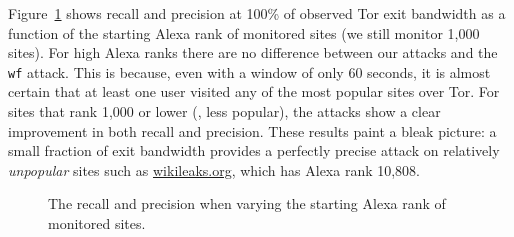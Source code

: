 Figure~\ref{fig:fpt:alexa} shows recall and precision at 100\% of
observed Tor exit bandwidth as a function of the starting Alexa rank of
monitored sites (we still monitor 1,000 sites).
For high Alexa ranks there are no difference between our attacks and the
\texttt{wf} attack. This is because, even with a window of only 60 seconds,
it is almost certain that at least one user visited any of the most popular
sites over Tor. For sites that rank 1,000 or lower (\ie, less popular),
the \name attacks show a clear improvement in both recall and precision.
These results paint a bleak picture: a small fraction of exit
bandwidth provides a perfectly precise attack on relatively
\emph{unpopular} sites such as \url{wikileaks.org}, which has Alexa rank
10,808.

\begin{figure}[t]
\centering
{}
\caption{The recall and precision when varying the starting Alexa rank of
monitored sites.}
\label{fig:fpt:alexa}
\end{figure}


